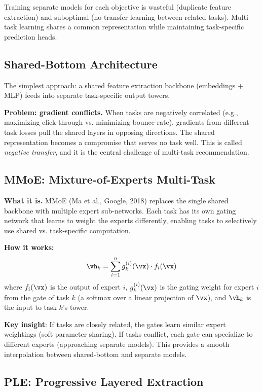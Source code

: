 Training separate models for each objective is wasteful (duplicate feature extraction) and suboptimal (no transfer learning between related tasks). Multi-task learning shares a common representation while maintaining task-specific prediction heads.

\subsection{Shared-Bottom Architecture}

The simplest approach: a shared feature extraction backbone (embeddings + MLP) feeds into separate task-specific output towers.

\textbf{Problem: gradient conflicts.} When tasks are negatively correlated (e.g., maximizing click-through vs. minimizing bounce rate), gradients from different task losses pull the shared layers in opposing directions. The shared representation becomes a compromise that serves no task well. This is called \textit{negative transfer}, and it is the central challenge of multi-task recommendation.

\subsection{MMoE: Mixture-of-Experts Multi-Task}

\textbf{What it is.} MMoE (Ma et al., Google, 2018) replaces the single shared backbone with multiple expert sub-networks. Each task has its own gating network that learns to weight the experts differently, enabling tasks to selectively use shared vs. task-specific computation.

\textbf{How it works:}
\begin{equation}
\vh_k = \sum_{i=1}^{n} g_k^{(i)}(\vx) \cdot f_i(\vx)
\end{equation}
where $f_i(\vx)$ is the output of expert $i$, $g_k^{(i)}(\vx)$ is the gating weight for expert $i$ from the gate of task $k$ (a softmax over a linear projection of $\vx$), and $\vh_k$ is the input to task $k$'s tower.

\textbf{Key insight}: If tasks are closely related, the gates learn similar expert weightings (soft parameter sharing). If tasks conflict, each gate can specialize to different experts (approaching separate models). This provides a smooth interpolation between shared-bottom and separate models.

\subsection{PLE: Progressive Layered Extraction}

